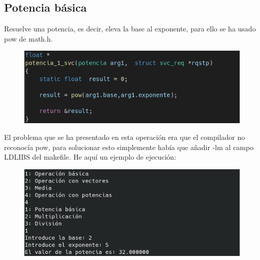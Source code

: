 \documentclass{article}
\begin{document}
	\subsection{Potencia básica}
	Resuelve una potencia, es decir, eleva la base al exponente, para ello se ha usado pow de math.h.
	\begin{figure}[H]
		\centering
		\includegraphics[totalheight=4cm]{img/22.png}
	\end{figure}
	El problema que se ha presentado en esta operación era que el compilador no reconocía pow, para solucionar esto simplemente había que añadir -lm al campo LDLIBS del makefile. He aquí un ejemplo de ejecución:
	\begin{figure}[H]
		\centering
		\includegraphics[totalheight=5cm]{img/23.png}
	\end{figure}
\end{document}
